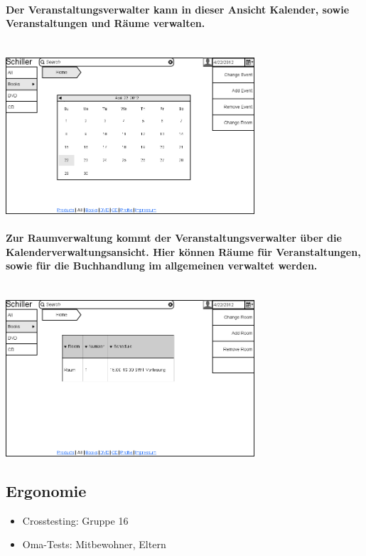\documentclass[a4paper]{article}
\begin{document}
\paragraph{Der Veranstaltungsverwalter kann in dieser Ansicht Kalender, sowie Veranstaltungen und Räume verwalten.\\ \\}
\includegraphics[width=350px]{18ChangeCalender.png}

\paragraph{Zur Raumverwaltung kommt der Veranstaltungsverwalter über die Kalenderverwaltungsansicht. Hier können Räume für Veranstaltungen, sowie für die Buchhandlung im allgemeinen verwaltet werden.\\ \\}
\includegraphics[width=350px]{19ChangeRoom.png}

\subsection{Ergonomie}

\begin{itemize}
	\item Crosstesting: Gruppe 16
	\item Oma-Tests: Mitbewohner, Eltern
\end{itemize}
\end{document}
